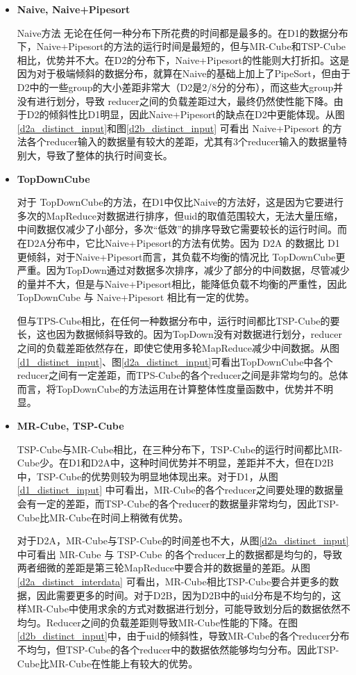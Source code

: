 \begin{itemize}

\item \textbf{Naive, Naive+Pipesort}

Naive方法 无论在任何一种分布下所花费的时间都是最多的。在D1的数据分布下，Naive+Pipesort的方法的运行时间是最短的，但与MR-Cube和TSP-Cube相比，优势并不大。在D2的分布下，Naive+Pipesort的性能则大打折扣。这是因为对于极端倾斜的数据分布，就算在Naive的基础上加上了PipeSort，但由于D2中的一些group的大小差距非常大（D2是2/8分的分布），而这些大group并没有进行划分，导致 reducer之间的负载差距过大，最终仍然使性能下降。由于D2的倾斜性比D1明显，因此Naive+Pipesort的缺点在D2中更能体现。从图\ref{d2a_distinct_input}和图\ref{d2b_distinct_input} 可看出 Naive+Pipesort 的方法各个reducer输入的数据量有较大的差距，尤其有3个reducer输入的数据量特别大，导致了整体的执行时间变长。

\item \textbf{TopDownCube}

对于 TopDownCube的方法，在D1中仅比Naive的方法好，这是因为它要进行多次的MapReduce对数据进行排序，但uid的取值范围较大，无法大量压缩，中间数据仅减少了小部分，多次``低效”的排序导致它需要较长的运行时间。而在D2A分布中，它比Naive+Pipesort的方法有优势。因为 D2A 的数据比 D1 更倾斜，对于Naive+Pipesort而言，其负载不均衡的情况比 TopDownCube更严重。因为TopDown通过对数据多次排序，减少了部分的中间数据，尽管减少的量并不大，但是与Naive+Pipesort相比，能降低负载不均衡的严重性，因此TopDownCube 与 Naive+Pipesort 相比有一定的优势。

但与TPS-Cube相比，在任何一种数据分布中，运行时间都比TSP-Cube的要长，这也因为数据倾斜导致的。因为TopDown没有对数据进行划分，reducer之间的负载差距依然存在，即使它使用多轮MapReduce减少中间数据。从图\ref{d1_distinct_input}、图\ref{d2a_distinct_input}可看出TopDownCube中各个reducer之间有一定差距，而TPS-Cube的各个reducer之间是非常均匀的。总体而言，将TopDownCube的方法运用在计算整体性度量函数中，优势并不明显。

\item \textbf{MR-Cube, TSP-Cube}

TSP-Cube与MR-Cube相比，在三种分布下，TSP-Cube的运行时间都比MR-Cube少。在D1和D2A中，这种时间优势并不明显，差距并不大，但在D2B中，TSP-Cube的优势则较为明显地体现出来。对于D1，从图\ref{d1_distinct_input} 中可看出，MR-Cube的各个reducer之间要处理的数据量会有一定的差距，而TSP-Cube的各个reducer的数据量非常均匀，因此TSP-Cube比MR-Cube在时间上稍微有优势。

对于D2A，MR-Cube与TSP-Cube的时间差也不大，从图\ref{d2a_distinct_input}中可看出 MR-Cube 与 TSP-Cube 的各个reducer上的数据都是均匀的，导致两者细微的差距是第三轮MapReduce中要合并的数据量的差距。从图\ref{d2a_distinct_interdata} 可看出，MR-Cube相比TSP-Cube要合并更多的数据，因此需要更多的时间。对于D2B，因为D2B中的uid分布是不均匀的，这样MR-Cube中使用求余的方式对数据进行划分，可能导致划分后的数据依然不均匀。Reducer之间的负载差距则导致MR-Cube性能的下降。在图\ref{d2b_distinct_input}中，由于uid的倾斜性，导致MR-Cube的各个reducer分布不均匀，但TSP-Cube的各个reducer中的数据依然能够均匀分布。因此TSP-Cube比MR-Cube在性能上有较大的优势。

\end{itemize}

